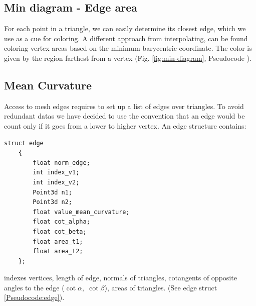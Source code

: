 \subsection{Min diagram - Edge area} \label{section:max-diagram}
For each point in a triangle, we can easily determine its closest edge, which we use as a cue for coloring.
A different approach from interpolating, can be found coloring vertex areas based on the minimum barycentric coordinate.
The color is given by the region farthest from a vertex (Fig. \ref{fig:min-diagram}, Pseudocode \color{red}{insert Pseudocode}\color{black}).

\subsection{Mean Curvature}
Access to mesh edges requires to set up a list of edges over triangles. To avoid redundant datas we have decided to use the convention that an edge would be count only if it goes from a lower to higher vertex. An edge structure contains:
\begin{lstlisting}[caption={Edge structure}]
    struct edge
    {
        float norm_edge;
        int index_v1;
        int index_v2;
        Point3d n1;
        Point3d n2;
        float value_mean_curvature;
        float cot_alpha;
        float cot_beta;
        float area_t1;
        float area_t2;
    };
\end{lstlisting} \label{Pseudocode:edge}

indexes vertices, length of edge, normals of triangles, cotangents of opposite angles to the edge ($\cot \alpha,\; \cot \beta$), areas of triangles. (See edge struct \ref{Pseudocode:edge}).

